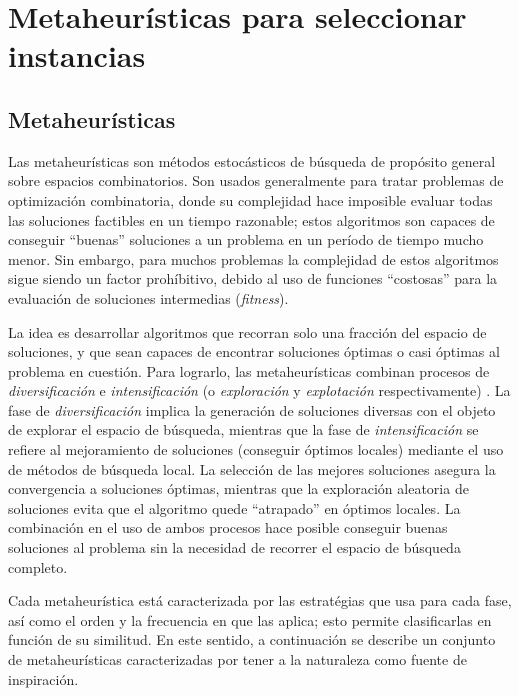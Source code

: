 \chapter{Metaheurísticas para seleccionar instancias}
\label{capitulo2}

\section{Metaheurísticas}

Las metaheurísticas son métodos estocásticos de búsqueda de propósito general sobre espacios combinatorios. Son usados generalmente para tratar problemas de optimización combinatoria, donde su complejidad hace imposible evaluar todas las soluciones factibles en un tiempo razonable; estos algoritmos son capaces de conseguir ``buenas'' soluciones a un problema en un período de tiempo mucho menor. Sin embargo, para muchos problemas la complejidad de estos algoritmos sigue siendo un factor prohíbitivo, debido al uso de funciones ``costosas'' para la evaluación de soluciones intermedias (\emph{fitness}).

La idea es desarrollar algoritmos que recorran solo una fracción del espacio de soluciones, y que sean capaces de encontrar soluciones óptimas o casi óptimas al problema en cuestión. Para lograrlo, las metaheurísticas combinan procesos de \emph{diversificación} e \emph{intensificación} (o \emph{exploración} y \emph{explotación} respectivamente) \cite{Yang:2008:NMA:1628847}. La fase de \emph{diversificación} implica la generación de soluciones diversas con el objeto de explorar el espacio de búsqueda, mientras que la fase de \emph{intensificación} se refiere al mejoramiento de soluciones (conseguir óptimos locales) mediante el uso de métodos de búsqueda local. La selección de las mejores soluciones asegura la convergencia a soluciones óptimas, mientras que la exploración aleatoria de soluciones evita que el algoritmo quede ``atrapado'' en óptimos locales. La combinación en el uso de ambos procesos hace posible conseguir buenas soluciones al problema sin la necesidad de recorrer el espacio de búsqueda completo.

Cada metaheurística está caracterizada por las estratégias que usa para cada fase, así como el orden y la frecuencia en que las aplica; esto permite clasificarlas en función de su similitud. En este sentido, a continuación se describe un conjunto de metaheurísticas caracterizadas por tener a la naturaleza como fuente de inspiración.

